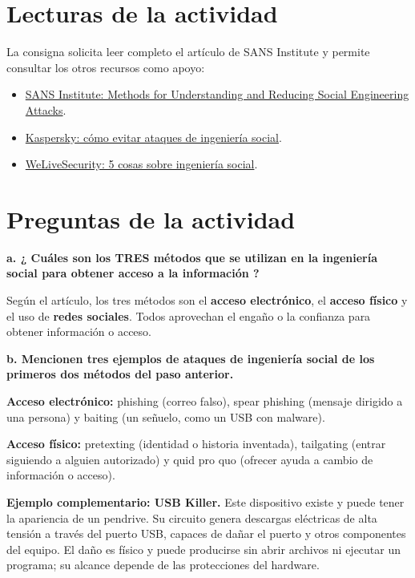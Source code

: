 \documentclass[12pt,a4paper]{article}
\begin{document}
\section{Lecturas de la actividad}
La consigna solicita leer completo el artículo de SANS Institute y permite consultar los otros recursos como apoyo:
\begin{itemize}
  \item \href{https://www.sans.org/reading-room/whitepapers/critical/methods-understanding-reducing-social-engineering-attacks-36972}{SANS Institute: Methods for Understanding and Reducing Social Engineering Attacks}.
  \item \href{https://latam.kaspersky.com/resource-center/threats/how-to-avoid-social-engineering-attacks}{Kaspersky: cómo evitar ataques de ingeniería social}.
  \item \href{https://www.welivesecurity.com/la-es/2016/01/06/5-cosas-sobre-ingenieria-social/}{WeLiveSecurity: 5 cosas sobre ingeniería social}.
\end{itemize}

\section{Preguntas de la actividad}
\par\textbf{a. ¿ Cuáles son los TRES métodos que se utilizan en la ingeniería social para obtener acceso a la información ?}

Según el artículo, los tres métodos son el \textbf{acceso electrónico}, el \textbf{acceso físico} y el uso de \textbf{redes sociales}. Todos aprovechan el engaño o la confianza para obtener información o acceso.

\par\textbf{b. Mencionen tres ejemplos de ataques de ingeniería social de los primeros dos métodos del paso anterior.}

\textbf{Acceso electrónico:} phishing (correo falso), spear phishing (mensaje dirigido a una persona) y baiting (un señuelo, como un USB con malware).

\textbf{Acceso físico:} pretexting (identidad o historia inventada), tailgating (entrar siguiendo a alguien autorizado) y quid pro quo (ofrecer ayuda a cambio de información o acceso).

\par\textbf{Ejemplo complementario: USB Killer.}
Este dispositivo existe y puede tener la apariencia de un pendrive. Su circuito genera descargas eléctricas de alta tensión a través del puerto USB, capaces de dañar el puerto y otros componentes del equipo. El daño es físico y puede producirse sin abrir archivos ni ejecutar un programa; su alcance depende de las protecciones del hardware.
\end{document}
